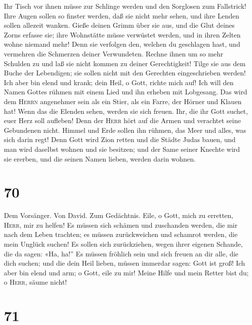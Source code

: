  Ihr Tisch vor ihnen müsse zur Schlinge werden und den
Sorglosen zum Fallstrick!  Ihre Augen sollen so finster
werden, daß sie nicht mehr sehen, und ihre Lenden sollen allezeit
wanken.  Gieße deinen Grimm über sie aus, und die Glut
deines Zorns erfasse sie;  ihre Wohnstätte müsse
verwüstet werden, und in ihren Zelten wohne niemand mehr!
 Denn sie verfolgen den, welchen du geschlagen hast, und
vermehren die Schmerzen deiner Verwundeten.  Rechne ihnen
um so mehr Schulden zu und laß sie nicht kommen zu deiner Gerechtigkeit!
 Tilge sie aus dem Buche der Lebendigen; sie sollen nicht
mit den Gerechten eingeschrieben werden!  Ich aber bin
elend und krank; dein Heil, o Gott, richte mich auf!  Ich
will den Namen Gottes rühmen mit einem Lied und ihn erheben mit
Lobgesang.  Das wird dem \textsc{Herrn} angenehmer sein
als ein Stier, als ein Farre, der Hörner und Klauen hat! 
Wenn das die Elenden sehen, werden sie sich freuen. Ihr, die ihr Gott
suchet, euer Herz soll aufleben!  Denn der \textsc{Herr}
hört auf die Armen und verachtet seine Gebundenen nicht. 
Himmel und Erde sollen ihn rühmen, das Meer und alles, was sich darin
regt!  Denn Gott wird Zion retten und die Städte Judas
bauen, und man wird daselbst wohnen und sie besitzen; 
und der Same seiner Knechte wird sie ererben, und die seinen Namen
lieben, werden darin wohnen.

\hypertarget{section-69}{%
\section{70}\label{section-69}}

 Dem Vorsänger. Von David. Zum Gedächtnis. Eile, o Gott,
mich zu erretten, \textsc{Herr}, mir zu helfen!  Es müssen
sich schämen und zuschanden werden, die mir nach dem Leben trachten; es
müssen zurückweichen und schamrot werden, die mein Unglück suchen!
 Es sollen sich zurückziehen, wegen ihrer eigenen Schande,
die da sagen: «Ha, ha!''  Es müssen fröhlich sein und sich
freuen an dir alle, die dich suchen; und die dein Heil lieben, müssen
immerdar sagen: Gott ist groß!  Ich aber bin elend und
arm; o Gott, eile zu mir! Meine Hilfe und mein Retter bist du; o
\textsc{Herr}, säume nicht!

\hypertarget{section-70}{%
\section{71}\label{section-70}}


